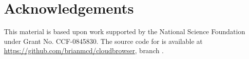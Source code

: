 \section{Acknowledgements}
\label{sec:ack}


This material is based upon work supported by the 
National Science Foundation under Grant No. CCF-0845830.
The source code for \cbtwo is available at \url{https://github.com/brianmcd/cloudbrowser},
branch .

